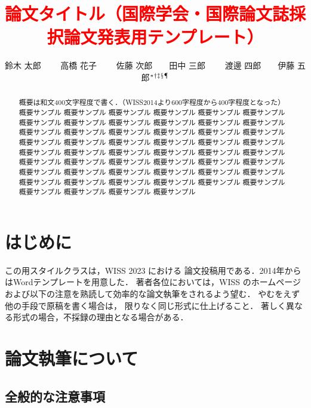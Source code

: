 \documentclass[twoside]{wiss}
\begin{document}
\title{\textcolor{red}{論文タイトル（国際学会・国際論文誌採択論文発表用テンプレート）}}
\etitle{}%
%
%
%
\author{鈴木 太郎 　　高橋 花子
　　佐藤 次郎　　田中 三郎
　　渡邊 四郎　　伊藤 五郎${}^* {}^\dag {}^\ddag {}^\mathsection
{}^\mathparagraph$}

\begin{abstract}
概要は和文400文字程度で書く．（WISS2014より600字程度から400字程度となった）
概要サンプル 概要サンプル 概要サンプル 概要サンプル 概要サンプル 概要サンプル
概要サンプル 概要サンプル 概要サンプル 概要サンプル 概要サンプル 概要サンプル
概要サンプル 概要サンプル 概要サンプル 概要サンプル 概要サンプル 概要サンプル
概要サンプル 概要サンプル 概要サンプル 概要サンプル 概要サンプル 概要サンプル
概要サンプル 概要サンプル 概要サンプル 概要サンプル 概要サンプル 概要サンプル
概要サンプル 概要サンプル 概要サンプル 概要サンプル 概要サンプル 概要サンプル
概要サンプル 概要サンプル 概要サンプル 概要サンプル 概要サンプル 概要サンプル
概要サンプル 概要サンプル 概要サンプル 概要サンプル 概要サンプル 概要サンプル
概要サンプル 概要サンプル 概要サンプル 概要サンプル
\end{abstract}

\maketitle

\section{はじめに}

この\LaTeXe{}用スタイルクラスは，WISS 2023 における
論文投稿用である．2014年からはWordテンプレートを用意した．
著者各位においては，WISS のホームページ\cite{wiss}
および以下の注意を熟読して効率的な論文執筆をされるよう望む．
やむをえず他の手段で原稿を書く場合は，
限りなく同じ形式に仕上げること．
著しく異なる形式の場合，不採録の理由となる場合がある．

\section{論文執筆について}

\subsection{全般的な注意事項}
\end{document}
